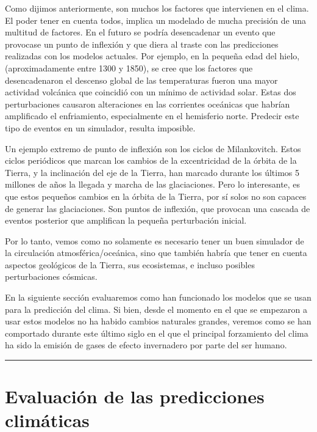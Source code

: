 \documentclass[
  10pt,
  a4paper,
  DIV=11,
  numbers=noendperiod,
  open=any]{scrreprt}
\numberwithin{equation}{chapter}
\numberwithin{equation}{section}
\renewcommand{\[}{\begin{equation}}
\renewcommand{\]}{\end{equation}}
\begin{document}
Como dijimos anteriormente, son muchos los factores que intervienen en
el clima. El poder tener en cuenta todos, implica un modelado de mucha
precisión de una multitud de factores. En el futuro se podría
desencadenar un evento que provocase un punto de inflexión y que diera
al traste con las predicciones realizadas con los modelos actuales. Por
ejemplo, en la pequeña edad del hielo, (aproximadamente entre 1300 y
1850), se cree que los factores que desencadenaron el descenso global de
las temperaturas fueron una mayor actividad volcánica que coincidió con
un mínimo de actividad solar. Estas dos perturbaciones causaron
alteraciones en las corrientes oceánicas que habrían amplificado el
enfriamiento, especialmente en el hemisferio norte. Predecir este
tipo de eventos en un simulador, resulta imposible.

Un ejemplo extremo de punto de inflexión son los ciclos de Milankovitch.
Estos ciclos periódicos que marcan los cambios de la excentricidad de la
órbita de la Tierra, y la inclinación del eje de la Tierra, han marcado
durante los últimos 5 millones de años la llegada y marcha de las
glaciaciones. Pero lo interesante, es que estos pequeños cambios en la
órbita de la Tierra, por sí solos no son capaces de generar las
glaciaciones. Son puntos de inflexión, que provocan una cascada de
eventos posterior que amplifican la pequeña perturbación inicial.

Por lo tanto, vemos como no solamente es necesario tener un buen
simulador de la circulación atmosférica/oceánica, sino que también
habría que tener en cuenta aspectos geológicos de la Tierra, sus
ecosistemas, e incluso posibles perturbaciones cósmicas.

En la siguiente sección evaluaremos como han funcionado los modelos que
se usan para la predicción del clima. Si bien, desde el momento en el
que se empezaron a usar estos modelos no ha habido cambios naturales
grandes, veremos como se han comportado durante este último siglo en el
que el principal forzamiento del clima ha sido la emisión de gases de
efecto invernadero por parte del ser humano.

\begin{center}\rule{0.5\linewidth}{0.5pt}\end{center}


\chapter{Evaluación de las predicciones
climáticas}\label{evaluaciuxf3n-de-las-predicciones-climuxe1ticas}
\end{document}

